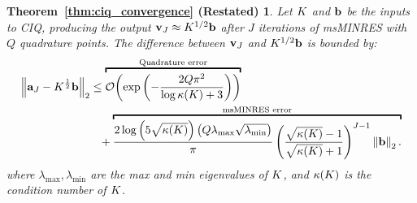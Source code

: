 






\newtheorem*{ciq_convergence}{Theorem~\ref{thm:ciq_convergence} (Restated)}
\begin{ciq_convergence}
  Let $K$ and $\mathbf{b}$ be the inputs to CIQ, producing the output $\mathbf{v}_J \approx K^{1/2} \mathbf{b}$ after $J$ iterations of msMINRES with $Q$ quadrature points.
  The difference between $\mathbf{v}_J$ and $K^{1/2} \mathbf{b}$ is bounded by:
  \begin{align*}
    \left\Vert \ba_J - \bK^{\frac 1 2} \bb \right\Vert_2
    &\leq
    \overbracket{
      \bigo{\exp\left( -\frac  {2 Q \pi^2}{\log \kappa(\bK) + 3} \right)}
    }^{\text{Quadrature error}}
    \\
    &\phantom{=} +
    \overbracket{
      \frac{ 2 \log \left( 5 \sqrt{\kappa(\bK)} \right)  \left( Q \lambda_\text{max} \sqrt{\lambda_\text{min}} \right) }{\pi}
      \left( \frac{ \sqrt{\kappa(\bK)} - 1}{ \sqrt{\kappa(\bK)} + 1} \right)^{J-1}
      \left\Vert \bb \right\Vert_2.
    }^{\text{msMINRES error}}
  \end{align*}
  where $\lambda_\text{max},\lambda_{\text{min}}$ are the max and min eigenvalues of $K$, and $\kappa(K)$ is the condition number of $K$.
\end{ciq_convergence}
%
